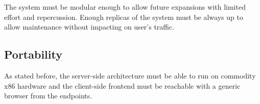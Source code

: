 \par The system must be modular enough to allow future expansions with limited effort and repercussion. Enough replicas
of the system must be always up to allow maintenance without impacting on user’s traffic.

\subsection{Portability}
\label{subsec:portability}%

\par As stated before, the server-side architecture must be able to run on commodity x86 hardware and the client-side
frontend must be reachable with a generic browser from the endpoints.
